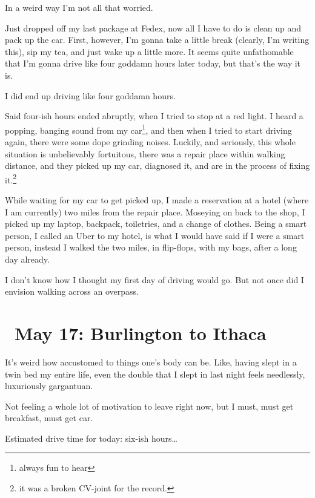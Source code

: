 \documentclass[../butidigress.tex]{subfiles}
\begin{document}
In a weird way I'm not all that worried.

\vspace*{\baselineskip}

Just dropped off my last package at Fedex, now all I have to do is clean up and pack up the car.
First, however, I'm gonna take a little break (clearly, I'm writing this), sip my tea, and just wake up a little more.
It seems quite unfathomable that I'm gonna drive like four goddamn hours later today, but that's the way it is.

\vspace*{\baselineskip}

I did end up driving like four goddamn hours.

Said four-ish hours ended abruptly, when I tried to stop at a red light.
I heard a popping, banging sound from my car\footnote{always fun to hear}, and then when I tried to start driving again, there were some dope grinding noises.
Luckily, and seriously, this whole situation is unbelievably fortuitous, there was a repair place within walking distance, and they picked up my car, diagnosed it, and are in the process of fixing it.\footnote{it was a broken CV-joint for the record.}

While waiting for my car to get picked up, I made a reservation at a hotel (where I am currently) two miles from the repair place.
Moseying on back to the shop, I picked up my laptop, backpack, toiletries, and a change of clothes.
Being a smart person, I called an Uber to my hotel, is what I would have said if I were a smart person, instead I walked the two miles, in flip-flops, with my bags, after a long day already.

I don't know how I thought my first day of driving would go.
But not once did I envision walking across an overpass.

\section{\ May 17: Burlington to Ithaca}
It's weird how accustomed to things one's body can be.
Like, having slept in a twin bed my entire life, even the double that I slept in last night feels needlessly, luxuriously gargantuan.

Not feeling a whole lot of motivation to leave right now, but I must, must get breakfast, must get car.

Estimated drive time for today: six-ish hours\ldots
\end{document}
